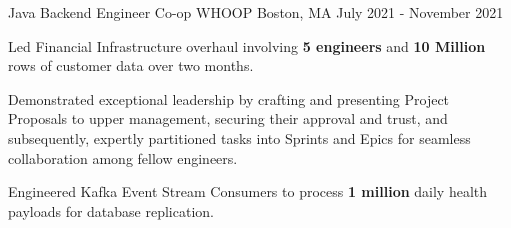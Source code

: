 \begin{cventries}
  \cventry
    {Java Backend Engineer Co-op} %
    {WHOOP} %
    {Boston, MA} %
    {July 2021 - November 2021} %
    {
      \begin{cvitems} %
        \item {Led Financial Infrastructure overhaul involving \textbf{5 engineers} and \textbf{10 Million} rows of customer data over two months.}
        \item {Demonstrated exceptional leadership by crafting and presenting Project Proposals to upper management, securing their approval and trust, and subsequently, expertly partitioned tasks into Sprints and Epics for seamless collaboration among fellow engineers.}
        \item {Engineered Kafka Event Stream Consumers to process \textbf{1 million} daily health payloads for database replication.}
      \end{cvitems}
    }
    

\end{cventries}
